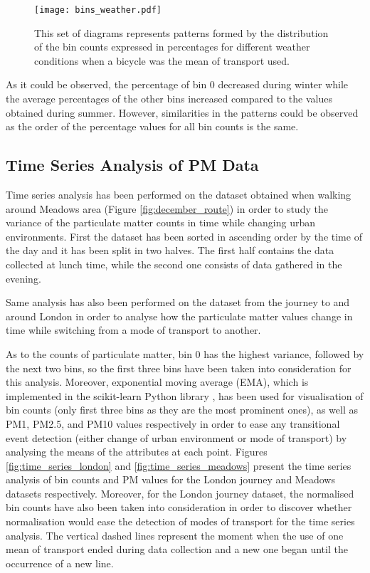 \documentclass[bsc,frontabs,twoside,singlespacing, parskip,deptreport]{infthesis}     %
\begin{document}
\begin{figure}[h!]
  \center
  \texttt{[image: bins\_weather.pdf]} 
  \caption{This set of diagrams represents patterns formed by the distribution of the bin counts expressed in percentages for different weather conditions when a bicycle was the mean of transport used.}
  \label{fig:bins_weather}
\end{figure}

As it could be observed, the percentage of bin 0 decreased during winter while the average percentages of the other bins increased compared to the values obtained during summer. However, similarities in the patterns could be observed as the order of the percentage values for all bin counts is the same.

\subsection{Time Series Analysis of PM Data}

Time series analysis has been performed on the dataset obtained when walking around Meadows area (Figure \ref{fig:december_route}) in order to study the variance of the particulate matter counts in time while changing urban environments. First the dataset has been sorted in ascending order by the time of the day and it has been split in two halves. The first half contains the data collected at lunch time, while the second one consists of data gathered in the evening.

Same analysis has also been performed on the dataset from the journey to and around London in order to analyse how the particulate matter values change in time while switching from a mode of transport to another.

As to the counts of particulate matter, bin 0 has the highest variance, followed by the next two bins, so the first three bins have been taken into consideration for this analysis. Moreover, exponential moving average (EMA), which is implemented in the scikit-learn Python library \cite{scikit-learn}, has been used for visualisation of bin counts (only first three bins as they are the most prominent ones), as well as PM1, PM2.5, and PM10 values respectively in order to ease any transitional event detection (either change of urban environment or mode of transport) by analysing the means of the attributes at each point. Figures \ref{fig:time_series_london} and \ref{fig:time_series_meadows} present the time series analysis of bin counts and PM values for the London journey and Meadows datasets respectively. Moreover, for the London journey dataset, the normalised bin counts have also been taken into consideration in order to discover whether normalisation would ease the detection of modes of transport for the time series analysis. The vertical dashed lines represent the moment when the use of one mean of transport ended during data collection and a new one began until the occurrence of a new line.
\end{document}
